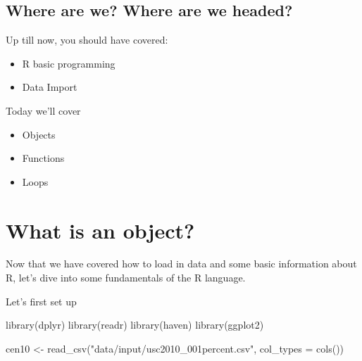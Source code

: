 \documentclass[
  letterpaper,
]{book}
\newenvironment{Shaded}{\begin{snugshade}}{\end{snugshade}}
\newcommand{\AttributeTok}[1]{\textcolor[rgb]{0.40,0.45,0.13}{#1}}
\newcommand{\FunctionTok}[1]{\textcolor[rgb]{0.28,0.35,0.67}{#1}}
\newcommand{\NormalTok}[1]{\textcolor[rgb]{0.00,0.23,0.31}{#1}}
\newcommand{\OtherTok}[1]{\textcolor[rgb]{0.00,0.23,0.31}{#1}}
\newcommand{\StringTok}[1]{\textcolor[rgb]{0.13,0.47,0.30}{#1}}
\providecommand{\tightlist}{%
  \setlength{\itemsep}{0pt}\setlength{\parskip}{0pt}}\usepackage{longtable,booktabs,array}
\theoremstyle{definition}
\theoremstyle{definition}
\theoremstyle{plain}
\theoremstyle{definition}
\theoremstyle{plain}
\theoremstyle{plain}
\theoremstyle{remark}
\begin{document}
\hypertarget{where-are-we-where-are-we-headed}{%
\subsection*{Where are we? Where are we
headed?}\label{where-are-we-where-are-we-headed}}

Up till now, you should have covered:

\begin{itemize}
\tightlist
\item
  R basic programming
\item
  Data Import
\end{itemize}

Today we'll cover

\begin{itemize}
\tightlist
\item
  Objects
\item
  Functions
\item
  Loops
\end{itemize}

\hypertarget{what-is-an-object}{%
\section{What is an object?}\label{what-is-an-object}}

Now that we have covered how to load in data and some basic information
about R, let's dive into some fundamentals of the R language.

Let's first set up

\begin{Shaded}
\begin{Highlighting}[]
\FunctionTok{library}\NormalTok{(dplyr)}
\FunctionTok{library}\NormalTok{(readr)}
\FunctionTok{library}\NormalTok{(haven)}
\FunctionTok{library}\NormalTok{(ggplot2)}
\end{Highlighting}
\end{Shaded}

\begin{Shaded}
\begin{Highlighting}[]
\NormalTok{cen10 }\OtherTok{\textless{}{-}} \FunctionTok{read\_csv}\NormalTok{(}\StringTok{"data/input/usc2010\_001percent.csv"}\NormalTok{, }\AttributeTok{col\_types =} \FunctionTok{cols}\NormalTok{())}
\end{Highlighting}
\end{Shaded}
\end{document}
